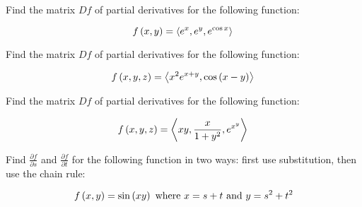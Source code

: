 \documentclass[12pt,letterpaper]{hmcpset}
\newcommand{\pn}[1]{\left( #1 \right)}
\newcommand{\vc}[1]{\left\langle #1 \right\rangle}
\begin{document}

\begin{problem}[1.a]

    Find the matrix $Df$ of partial derivatives for the following function:

    \[
        f\pn{x,y} = \vc{e^x, e^y, e^{\cos x}}\\
    \]

\end{problem}

\begin{solution}

\end{solution}

\begin{problem}[1.b]

    Find the matrix $Df$ of partial derivatives for the following function:

    \[
        f\pn{x,y,z} = \vc{x^2e^{x+y}, \cos\pn{x-y}}\\
    \]

\end{problem}

\begin{solution}
\end{solution}

\begin{problem}[1.c]

    Find the matrix $Df$ of partial derivatives for the following function:

    \[
        f\pn{x,y,z} = \vc{xy, \frac{x}{1+y^2}, e^{x^y}}\\
    \]

\end{problem}

\begin{solution}
\end{solution}

\begin{problem}[2.a]

    Find $\frac{\partial f}{\partial s}$ and $\frac{\partial f}{\partial t}$ for the following function in two ways: first use substitution, then use the chain rule:

    \[
        f\pn{x,y} = \sin\pn{xy} \text{ where $x=s+t$ and $y=s^2+t^2$}\\
    \]

\end{problem}

\begin{solution}
\end{solution}
\end{document}
